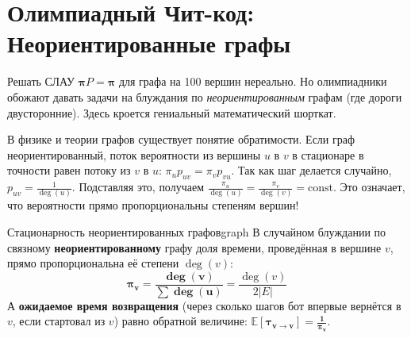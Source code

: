 \documentclass[12pt,a4paper]{article}
\newcommand{\E}{\mathbb{E}}
\begin{document}
\newpage
\section{Олимпиадный Чит-код: Неориентированные графы}

Решать СЛАУ $\bm{\pi} P = \bm{\pi}$ для графа на 100 вершин нереально. Но олимпиадники обожают давать задачи на блуждания по \textit{неориентированным} графам (где дороги двусторонние). Здесь кроется гениальный математический шорткат.

\begin{insight}
В физике и теории графов существует понятие обратимости. Если граф неориентированный, поток вероятности из вершины $u$ в $v$ в стационаре в точности равен потоку из $v$ в $u$: $\pi_u p_{uv} = \pi_v p_{vu}$. 
Так как шаг делается случайно, $p_{uv} = \frac{1}{\deg(u)}$. Подставляя это, получаем $\frac{\pi_u}{\deg(u)} = \frac{\pi_v}{\deg(v)} = \text{const}$. Это означает, что вероятности прямо пропорциональны степеням вершин!
\end{insight}

\begin{theorem}{Стационарность неориентированных графов}{graph}
В случайном блуждании по связному \textbf{неориентированному} графу доля времени, проведённая в вершине $v$, прямо пропорциональна её степени $\deg(v)$:
\[ \bm{\pi_v = \frac{\deg(v)}{\sum \deg(u)}} = \frac{\deg(v)}{2 |E|} \]
А \textbf{ожидаемое время возвращения} (через сколько шагов бот впервые вернётся в $v$, если стартовал из $v$) равно обратной величине: $\bm{\E[\tau_{v \to v}] = \frac{1}{\pi_v}}$.
\end{theorem}
\end{document}
